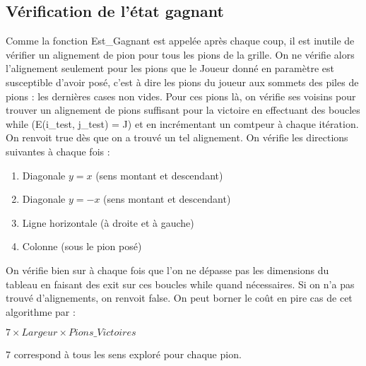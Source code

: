 \documentclass[a4paper, 10pt, french]{article}
\begin{document}
{    \subsection{Vérification de l'état gagnant}
    {
        Comme la fonction Est\_Gagnant est appelée après chaque coup, il est inutile de vérifier un alignement de pion pour
        tous les pions de la grille. On ne vérifie alors l'alignement seulement pour les pions que le Joueur donné en paramètre
        est susceptible d'avoir posé, c'est à dire les pions du joueur aux sommets des piles de pions : les dernières cases
        non vides.
        Pour ces pions là, on vérifie ses voisins pour trouver un alignement de pions suffisant pour la victoire en effectuant
        des boucles while (E(i\_test, j\_test) = J) et en incrémentant un comtpeur à chaque itération. On renvoit true dès que
        on a trouvé un tel alignement. On vérifie les directions suivantes à chaque fois :
        \begin{enumerate}
            \item Diagonale $y = x$ (sens montant et descendant)
            \item Diagonale $y = -x$ (sens montant et descendant)
            \item Ligne horizontale (à droite et à gauche)
            \item Colonne (sous le pion posé)
        \end{enumerate}
        On vérifie bien sur à chaque fois que l'on ne dépasse pas les dimensions du tableau en faisant des exit sur ces boucles
        while quand nécessaires. Si on n'a pas trouvé d'alignements, on renvoit false.
        On peut borner le coût en pire cas de cet algorithme par :
        \begin{center}
            $7 \times Largeur \times Pions\_Victoires$
        \end{center}
        7 correspond à tous les sens exploré pour chaque pion.
    }

}
\end{document}
